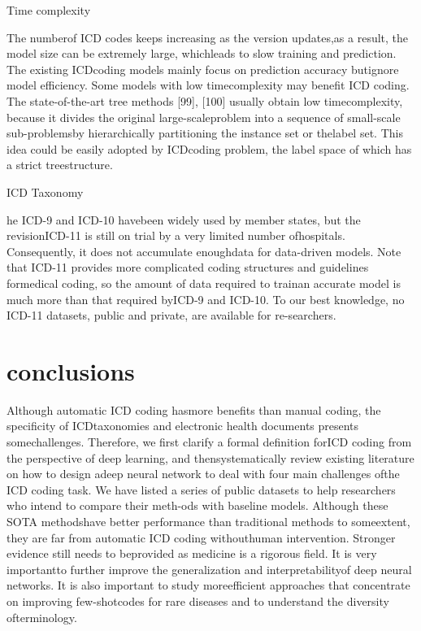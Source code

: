 \subparagraph{Time complexity}
The  numberof  ICD  codes  keeps  increasing  as  the  version  updates,as a result, the model size can be extremely large, whichleads to slow training and prediction. The existing ICDcoding models mainly focus on prediction accuracy butignore  model  efficiency.  Some  models  with  low  timecomplexity  may  benefit  ICD  coding.  The  state-of-the-art  tree  methods  [99],  [100]  usually  obtain  low  timecomplexity,  because  it  divides  the  original  large-scaleproblem  into  a  sequence  of  small-scale  sub-problemsby  hierarchically  partitioning  the  instance  set  or  thelabel  set.  This  idea  could  be  easily  adopted  by  ICDcoding problem, the label space of which has a strict treestructure.

\subparagraph{ICD Taxonomy}
he  ICD-9  and  ICD-10  havebeen  widely  used  by  member  states,  but  the  revisionICD-11  is  still  on  trial  by  a  very  limited  number  ofhospitals. Consequently, it does not accumulate enoughdata for data-driven models. Note that ICD-11 provides more complicated coding structures and guidelines formedical coding, so the amount of data required to trainan accurate model is much more than that required byICD-9  and  ICD-10.  To  our  best  knowledge,  no  ICD-11  datasets,  public  and  private,  are  available  for  re-searchers. 

\part{conclusions}
Although  automatic  ICD  coding  hasmore  benefits  than  manual  coding,  the  specificity  of  ICDtaxonomies and electronic health documents presents somechallenges. Therefore, we first clarify a formal definition forICD coding from the perspective of deep learning, and thensystematically review existing literature on how to design adeep neural network to deal with four main challenges ofthe ICD coding task. We have listed a series of public datasets to help researchers who intend to compare their meth-ods  with  baseline  models.  Although  these  SOTA  methodshave better performance than traditional methods to someextent,  they  are  far  from  automatic  ICD  coding  withouthuman  intervention.  Stronger  evidence  still  needs  to  beprovided as medicine is a rigorous field. It is very importantto  further  improve  the  generalization  and  interpretabilityof deep neural networks. It is also important to study moreefficient approaches that concentrate on improving few-shotcodes  for  rare  diseases  and  to  understand  the  diversity  ofterminology.  